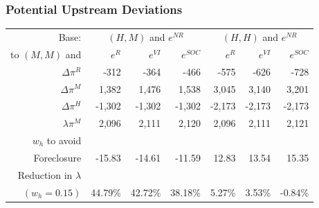 \begin{frame}[label=moredeviations]
\frametitle{Potential Upstream Deviations}
\footnotesize
\begin{table}[htp]
\begin{center}
\begin{tabular}{| r | r r r | r r r|} 
\hline
\multicolumn{1}{|r|}{Base: }& \multicolumn{3}{c|}{$(H,M)$ and $e^{NR}$ }  & \multicolumn{3}{c|}{ $(H,H)$ and $e^{NR}$} \\ 
\multicolumn{1}{|r|}{to  $(M,M)$ and}& $e^{R}$ & $e^{VI}$ & $e^{SOC}$ & $e^{R}$ & $e^{VI}$ & $e^{SOC}$ \\ \hline
$\Delta \pi^R$ & -312 & -364 & -466 & -575 & -626 & -728 \\
$\Delta \pi^M$ & 1,382 & 1,476 & 1,538 & 3,045 & 3,140 & 3,201 \\
$\Delta \pi^H$ & -1,302 & -1,302 & -1,302 & -2,173 & -2,173 & -2,173 \\
$\lambda \pi^M$ & 2,096 & 2,111 & 2,120& 2,096 & 2,111 & 2,121 \\ \hline
$w_h$ to avoid &&&&&&\\
Foreclosure & -15.83 & -14.61 & -11.59 & 12.83 & 13.54 & 15.35 \\
Reduction in $\lambda$ &&&&&&\\
$(w_h=0.15)$ & 44.79\% & 42.72\% & 38.18\% & 5.27\% & 3.53\% & -0.84\% \\ \hline
\end{tabular}
\end{center}
\label{tab:discount}
\end{table}
\hyperlink{deviations}{}
\end{frame}





\begin{frame}
\frametitle{}
\end{frame}





\begin{frame}
\frametitle{}
\end{frame}

\begin{frame}
\frametitle{}
\end{frame}

\begin{frame}
\frametitle{}
\end{frame}





